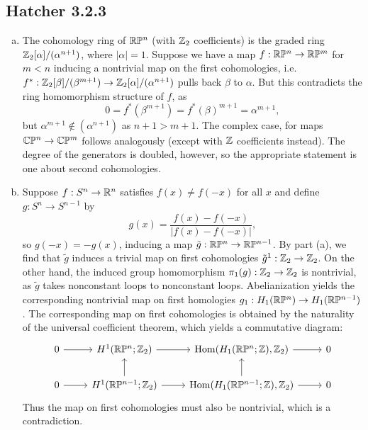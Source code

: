 \documentclass{../mathnotes}
\begin{document}
\subsection*{Hatcher 3.2.3}
\begin{enumerate}[(a)]
    \item The cohomology ring of $\mathbb{R}\mathbb{P}^n$ (with $\mathbb{Z}_2$ coefficients) is the graded ring
        $\mathbb{Z}_2[\alpha]/(\alpha^{n+1})$, where $|\alpha|=1$. Suppose we have a map $f:\mathbb{R}\mathbb{P}^n\to\mathbb{R}\mathbb{P}^m$
        for $m<n$ inducing a nontrivial map on the first cohomologies, i.e.
        $f^*:\mathbb{Z}_2[\beta]/(\beta^{m+1})\to\mathbb{Z}_2[\alpha]/(\alpha^{n+1})$ pulls back $\beta$
        to $\alpha$. But this contradicts the ring homomorphism structure of $f$, as
        \[0=f^*(\beta^{m+1})=f^*(\beta)^{m+1}=\alpha^{m+1},\]
        but $\alpha^{m+1}\notin(\alpha^{n+1})$ as $n+1>m+1$.
        The complex case, for maps $\mathbb{C}\mathbb{P}^n\to\mathbb{C}\mathbb{P}^m$ follows analogously (except with $\mathbb{Z}$
        coefficients instead). The degree of the generators is doubled, however, so the
        appropriate statement is one about second cohomologies.
    \item Suppose $f:S^n\to\mathbb{R}^n$ satisfies $f(x)\neq f(-x)$ for all $x$ and define
        $g:S^n\to S^{n-1}$ by 
        \[g(x)=\frac{f(x)-f(-x)}{|f(x)-f(-x)|},\]
        so $g(-x)=-g(x)$, inducing a map $\tilde g:\mathbb{R}\mathbb{P}^n\to\mathbb{R}\mathbb{P}^{n-1}$. By part (a), we
        find that $\tilde g$ induces a trivial map on first cohomologies $\tilde g^1:\mathbb{Z}_2\to\mathbb{Z}_2$.
        On the other hand, the induced group homomorphism $\pi_1(g):\mathbb{Z}_2\to\mathbb{Z}_2$ is
        nontrivial, as $\tilde g$ takes nonconstant loops to nonconstant loops. Abelianization
        yields the corresponding nontrivial map on first homologies $g_1:H_1(\mathbb{R}\mathbb{P}^{n})\to H_1(\mathbb{R}\mathbb{P}^{n-1})$.
        The corresponding map on first cohomologies is obtained by the naturality of the
        universal coefficient theorem, which yields a commutative diagram:
        \begin{equation*}
            \begin{tikzcd}
                0\ar{r}& H^1(\RP^n;\Z_2)\ar{r}& \Hom(H_1(\RP^n;\Z),\Z_2)\ar{r} & 0\\
                0\ar{r}& H^1(\RP^{n-1};\Z_2)\ar{r}\ar{u}& \Hom(H_1(\RP^{n-1};\Z),\Z_2)\ar{r}\ar{u} & 0
            \end{tikzcd}
        \end{equation*}
        Thus the map on first cohomologies must also be nontrivial, which is a contradiction.
\end{enumerate}
\end{document}
